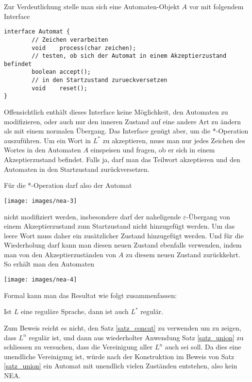 Zur Verdeutlichung stelle man sich eine Automaten-Objekt $A$ vor mit
folgendem Interface
\begin{verbatim}
interface Automat {
        // Zeichen verarbeiten
        void    process(char zeichen);
        // testen, ob sich der Automat in einem Akzeptierzustand befindet
        boolean accept();
        // in den Startzustand zurueckversetzen
        void    reset();
}
\end{verbatim}
Offensichtlich enthält dieses Interface keine Möglichkeit, den Automaten
zu modifizieren, oder auch nur den inneren Zustand auf eine andere Art
zu ändern als mit einem normalen Übergang.
Das Interface genügt aber, um die *-Operation auszuführen.
Um ein Wort in $L^*$ zu akzeptieren, muss man nur jedes Zeichen
des Wortes in den Automaten $A$ einspeisen und fragen, ob er sich
in einem Akzeptierzustand befindet.
Falls ja, darf man das Teilwort
akzeptieren und den Automaten in den Startzustand zurückversetzen.

Für die *-Operation darf also der Automat
\begin{center}
\texttt{[image: images/nea-3]}
\end{center}
nicht modifiziert werden, insbesondere darf der naheligende
$\varepsilon$-Übergang von einem Akzeptierzustand zum Startzustand
nicht hinzugefügt werden.
Um das leere Wort muss daher ein zusätzlicher Zustand hinzugefügt werden.
Und für die Wiederholung darf kann man diesen neuen Zustand ebenfalls
verwenden, indem man von den Akzeptierzuständen von $A$ zu diesem
neuen Zustand zurückkehrt.
So erhält man den Automaten
\begin{center}
\texttt{[image: images/nea-4]}
\end{center}

Formal kann man das Resultat wie folgt zusammenfassen:
\begin{satz}
%
\label{satz_star}
Ist $L$ eine reguläre Sprache, dann ist auch $L^*$ regulär.
\end{satz}

Zum Beweis reicht es nicht, den Satz \ref{satz_concat} zu verwenden
um zu zeigen, dass $L^n$ regulär ist, und dann aus wiederholter
Anwendung Satz \ref{satz_union} zu schliessen zu versuchen,
dass die Vereinigung aller $L^n$ auch sei soll.
Da dies eine unendliche
Vereinigung ist, würde nach der Konstruktion im Beweis von Satz
\ref{satz_union} ein Automat mit unendlich vielen
Zuständen entstehen, also kein NEA.


